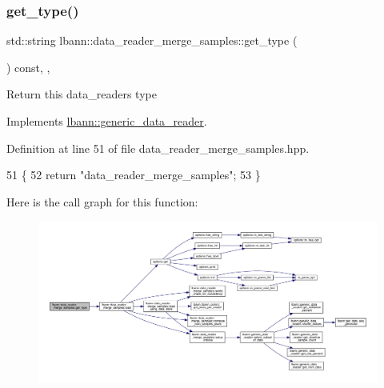 \subsubsection{\texorpdfstring{get\+\_\+type()}{get\_type()}}
{\footnotesize\ttfamily std\+::string lbann\+::data\+\_\+reader\+\_\+merge\+\_\+samples\+::get\+\_\+type (\begin{DoxyParamCaption}{ }\end{DoxyParamCaption}) const\hspace{0.3cm}{\ttfamily [inline]}, {\ttfamily [override]}, {\ttfamily [virtual]}}

Return this data\+\_\+reader\textquotesingle{}s type 

Implements \hyperlink{classlbann_1_1generic__data__reader_abeb849fb8e10b4fa317c90bc33f61758}{lbann\+::generic\+\_\+data\+\_\+reader}.



Definition at line 51 of file data\+\_\+reader\+\_\+merge\+\_\+samples.\+hpp.


\begin{DoxyCode}
51                                       \{
52     \textcolor{keywordflow}{return} \textcolor{stringliteral}{"data\_reader\_merge\_samples"};
53   \}
\end{DoxyCode}
Here is the call graph for this function\+:\nopagebreak
\begin{figure}[H]
\begin{center}
\leavevmode
\includegraphics[width=350pt]{classlbann_1_1data__reader__merge__samples_a5d24385daebfd31343e6afc11b0439d1_cgraph}
\end{center}
\end{figure}
\mbox{\label{classlbann_1_1data__reader__merge__samples_ab3554341417f5eba95b9c1098af40410}} 
